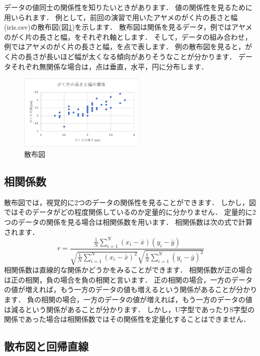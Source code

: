 データの値同士の関係性を知りたいときがあります．
値の関係性を見るために用いられます．
例として，前回の演習で用いたアヤメのがく片の長さと幅 (iris.csv)の散布図(図\ref{fig:scatter})を示します．
散布図は関係を見るデータ，例ではアヤメのがく片の長さと幅，をそれぞれ軸とします．
そして，データの組み合わせ，例ではアヤメのがく片の長さと幅，を点で表します．
例の散布図を見ると，がく片の長さが長いほど幅が太くなる傾向がありそうなことが分かります．
データそれぞれ無関係な場合は，点は垂直，水平，円に分布します．

\begin{figure}[htbp]
    \centering
    \includegraphics[width=6cm]{chap2/scatter.png}
    \caption{散布図}
    \label{fig:scatter}
\end{figure}

\subsection{相関係数}

散布図では，視覚的に2つのデータの関係性を見ることができます．
しかし，図ではそのデータがどの程度関係しているのか定量的に分かりません．
定量的に2つのデータの関係を見る場合は相関係数を用います．
相関係数は次の式で計算されます．
\begin{equation}
    \label{eq:1}
    r = \frac{\frac{1}{N} \sum_{i=1}^N (x_i - \bar{x})(y_i - \bar{y})}{\sqrt{\frac{1}{N} \sum_{i=1}^N (x_i - \bar{x})^2} \sqrt{\frac{1}{N} \sum_{i=1}^N(y_i - \bar{y})^2}}
\end{equation}
相関係数は直線的な関係かどうかをみることができます．
相関係数が正の場合は正の相関，負の場合を負の相関と言います．
正の相関の場合，一方のデータの値が増えれば，もう一方のデータの値も増えるという関係があることが分かります．
負の相関の場合，一方のデータの値が増えれば，もう一方のデータの値は減るという関係があることが分かります．
しかし，U字型であったりS字型の関係であった場合は相関係数ではその関係性を定量化することはできません．

\subsection{散布図と回帰直線}

